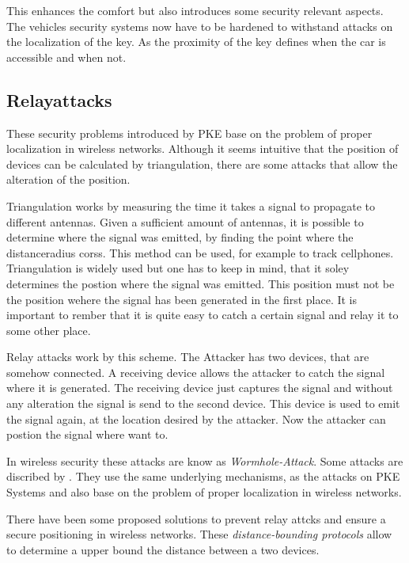 	This enhances the comfort but also introduces some security relevant aspects.
	The vehicles security systems now have to be hardened
	to withstand attacks on the localization of the key.
	As the proximity of the key defines when the car is accessible and when not. 

\subsection*{Relayattacks}
	These security problems introduced by PKE base on the problem of proper
	localization in wireless networks.
	Although it seems intuitive that the position of devices can be calculated by
	triangulation, there are some attacks that allow the alteration of the position.

	Triangulation works by measuring the time it takes a signal to propagate
	to different antennas.
	Given a sufficient amount of antennas,
	it is possible to determine where the signal was emitted,
	by finding the point where the distanceradius corss. 				%
	This method can be used,
	for example to track cellphones.	%
	Triangulation is widely used but one has to keep in mind,
	that it soley determines the postion where the signal was emitted.
	This position must not be the position wehere the signal has been generated in the first place.
	It is important to rember that it is quite easy to catch
	a certain signal and relay it to some other place.

	Relay attacks work by this scheme.
	The Attacker has two devices,
	that are somehow connected.
	A receiving device allows the attacker to catch the signal where it is generated.
	The receiving device just captures the signal and
	without any alteration the signal is send to the second device.
	This device is used to emit the signal again,
	at the location desired by the attacker.
	Now the attacker can postion the signal where want to.

	In wireless security these attacks are know as \textsl{Wormhole-Attack}.
	Some attacks are discribed by \citeauthor{wormhole}.	%
	They use the same underlying mechanisms, as the attacks on PKE Systems
	and also base on the problem of proper localization in wireless networks.

	There have been some proposed solutions to prevent relay attcks and
	ensure a secure positioning in wireless networks.
	These \textsl{distance-bounding protocols} allow to determine a upper
	bound the distance between a two devices.
